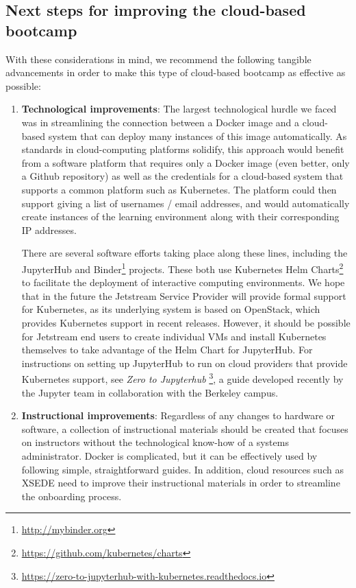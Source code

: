 \subsection{Next steps for improving the cloud-based bootcamp}

With these considerations in mind, we recommend the following tangible
advancements in order to make this type of cloud-based bootcamp as effective
as possible:

\begin{enumerate}

\item {\bf Technological improvements}: The largest technological hurdle we
faced was in streamlining the connection between a Docker image and a
cloud-based system that can deploy many instances of this image automatically.
As standards in cloud-computing platforms solidify, this approach would
benefit from a software platform that requires only a Docker image (even better,
only a Github repository) as well as the credentials for a cloud-based system
that supports a common platform such as Kubernetes. The platform could then
support giving a list of usernames / email addresses, and would automatically
create instances of the learning environment along with their corresponding IP
addresses.

There are several software efforts taking place along these
lines, including the JupyterHub \cite{perez2015project} and Binder\footnote{\url{http://mybinder.org}}
projects. These both use Kubernetes Helm Charts\footnote{\url{https://github.com/kubernetes/charts}} to
facilitate the deployment of interactive computing environments.
We hope that in the future the Jetstream Service Provider will provide
formal support for Kubernetes, as its underlying system is based on OpenStack,
which provides Kubernetes support in recent releases.
However, it should be possible for Jetstream end users to create individual VMs
and install Kubernetes themselves to take advantage of the Helm Chart for JupyterHub.
For instructions on setting up JupyterHub to run on cloud providers that provide
Kubernetes support, see \textit{Zero to Jupyterhub}
\footnote{\url{https://zero-to-jupyterhub-with-kubernetes.readthedocs.io}},
a guide developed recently by the Jupyter team in collaboration with the Berkeley campus.

\item {\bf Instructional improvements}: Regardless of any changes to hardware
or software, a collection of instructional materials should be created that
focuses on instructors without the technological know-how of a systems administrator.
Docker is complicated, but it can be effectively used by following simple,
straightforward guides. In addition, cloud resources such as XSEDE need to
improve their instructional materials in order to
streamline the onboarding process.


\end{enumerate}
